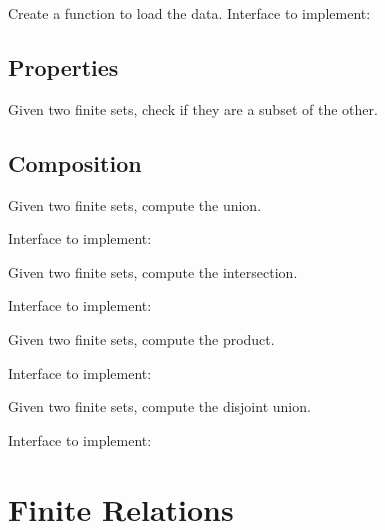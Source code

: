 

\begin{exercise}
  Create a function to load the data.
  Interface to implement:
%

\end{exercise}

\subsection{Properties}

\begin{exercise}
  Given two finite sets, check if they are a subset of the other.
\end{exercise}

\subsection{Composition}

\begin{exercise}
  Given two finite sets, compute the union.

  Interface to implement:
\end{exercise}

\begin{exercise}
  Given two finite sets, compute the intersection.

  Interface to implement:
\end{exercise}



\begin{exercise}
  Given two finite sets, compute the product.

  Interface to implement:
\end{exercise}
\begin{exercise}
  Given two finite sets, compute the disjoint union.

  Interface to implement:
\end{exercise}


\section{Finite Relations}

